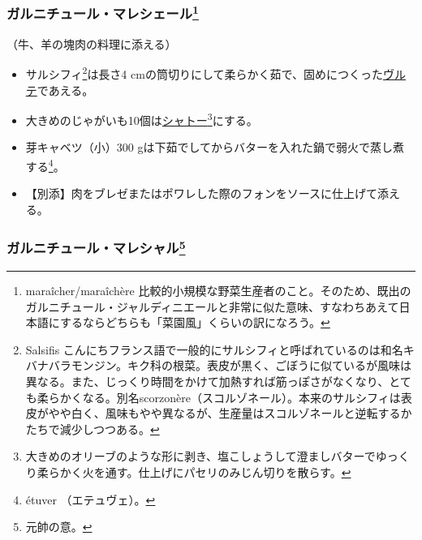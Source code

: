 \begin{recette}
\atoaki{}

\hypertarget{garniture-maraichere}{%
\subsubsection[ガルニチュール・マレシェール]{\texorpdfstring{ガルニチュール・マレシェール\footnote{maraîcher/maraîchère
  比較的小規模な野菜生産者のこと。そのため、既出のガルニチュール・ジャルディニエールと非常に似た意味、すなわちあえて日本語にするならどちらも「菜園風」くらいの訳になろう。}}{ガルニチュール・マレシェール}}\label{garniture-maraichere}}



（牛、羊の塊肉の料理に添える）

\begin{itemize}
\item
  サルシフィ\footnote{Salsifis
    こんにちフランス語で一般的にサルシフィと呼ばれているのは和名キバナバラモンジン。キク科の根菜。表皮が黒く、ごぼうに似ているが風味は異なる。また、じっくり時間をかけて加熱すれば筋っぽさがなくなり、とても柔らかくなる。別名scorzonère（スコルゾネール）。本来のサルシフィは表皮がやや白く、風味もやや異なるが、生産量はスコルゾネールと逆転するかたちで減少しつつある。}は長さ4
  cmの筒切りにして柔らかく茹で、固めにつくった\protect\hyperlink{veloute}{ヴルテ}であえる。
\item
  大きめのじゃがいも10個は\protect\hyperlink{pommes-de-terre-chateau}{シャトー}\footnote{大きめのオリーブのような形に剥き、塩こしょうして澄ましバターでゆっくり柔らかく火を通す。仕上げにパセリのみじん切りを散らす。}にする。
\item
  芽キャベツ（小）300
  gは下茹でしてからバターを入れた鍋で弱火で蒸し煮する\footnote{étuver
    （エテュヴェ）。}。
\item
  【別添】肉をブレゼまたはポワレした際のフォンをソースに仕上げて添える。
\end{itemize}

\atoaki{}

\hypertarget{garniture-marechal}{%
\subsubsection[ガルニチュール・マレシャル]{\texorpdfstring{ガルニチュール・マレシャル\footnote{元帥の意。}}{ガルニチュール・マレシャル}}\label{garniture-marechal}}


\end{recette}
